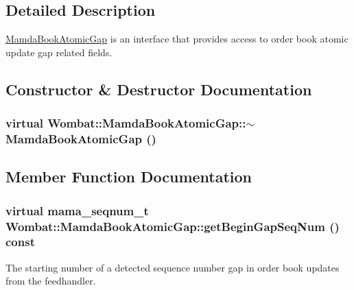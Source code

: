 \subsection{Detailed Description}
\hyperlink{classWombat_1_1MamdaBookAtomicGap}{Mamda\-Book\-Atomic\-Gap} is an interface that provides access to order book atomic update gap related fields. 



\subsection{Constructor \& Destructor Documentation}
\hypertarget{classWombat_1_1MamdaBookAtomicGap_b429b9d3e658e1cd7f05e3c9cb194298}{
\subsubsection[$\sim$MamdaBookAtomicGap]{\setlength{\rightskip}{0pt plus 5cm}virtual Wombat::Mamda\-Book\-Atomic\-Gap::$\sim$Mamda\-Book\-Atomic\-Gap ()}}
\label{classWombat_1_1MamdaBookAtomicGap_b429b9d3e658e1cd7f05e3c9cb194298}




\subsection{Member Function Documentation}
\hypertarget{classWombat_1_1MamdaBookAtomicGap_8023460971323b5c43af54d8a39592e2}{
\subsubsection[getBeginGapSeqNum]{\setlength{\rightskip}{0pt plus 5cm}virtual mama\_\-seqnum\_\-t Wombat::Mamda\-Book\-Atomic\-Gap::get\-Begin\-Gap\-Seq\-Num () const}}
\label{classWombat_1_1MamdaBookAtomicGap_8023460971323b5c43af54d8a39592e2}


The starting number of a detected sequence number gap in order book updates from the feedhandler. 


